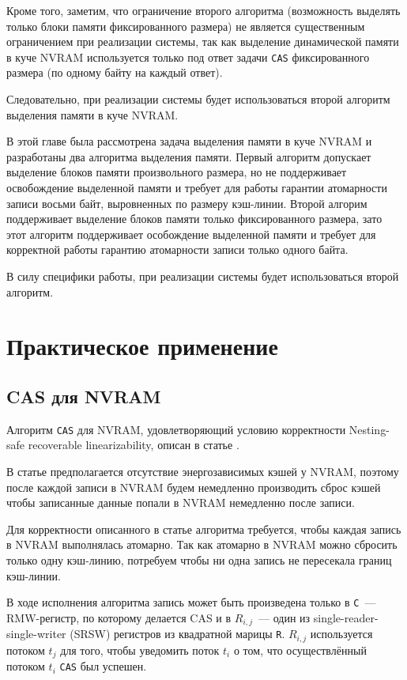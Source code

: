 \documentclass[times,specification,annotation]{itmo-student-thesis}
\begin{document}
Кроме того, заметим, что ограничение второго алгоритма (возможность выделять только блоки памяти фиксированного размера) не является существенным ограничением при реализации системы, так как выделение динамической памяти в куче NVRAM используется только под ответ задачи \texttt{CAS} фиксированного размера (по одному байту на каждый ответ).

Следовательно, при реализации системы будет использоваться второй алгоритм выделения памяти в куче NVRAM.

\chapterconclusion

В этой главе была рассмотрена задача выделения памяти в куче NVRAM и разработаны два алгоритма выделения памяти. Первый алгоритм допускает выделение блоков памяти произвольного размера, но не поддерживает освобождение выделенной памяти и требует для работы гарантии атомарности записи восьми байт, выровненных по размеру кэш-линии. Второй алгорим поддерживает выделение блоков памяти только фиксированного размера, зато этот алгоритм поддерживает особождение выделенной памяти и требует для корректной работы гарантию атомарности записи только одного байта.

В силу специфики работы, при реализации системы будет использоваться второй алгоритм.

\chapter{Практическое применение}

\section{CAS для NVRAM}

Алгоритм \texttt{CAS} для NVRAM, удовлетворяющий условию корректности Nesting-safe recoverable linearizability, описан в статье \cite{attiya2018nesting}.

В статье предполагается отсутствие энергозависимых кэшей у NVRAM, поэтому после каждой записи в NVRAM будем немедленно производить сброс кэшей чтобы записанные данные попали в NVRAM немедленно после записи.

Для корректности описанного в статье алгоритма требуется, чтобы каждая запись в NVRAM выполнялась атомарно. Так как атомарно в NVRAM можно сбросить только одну кэш-линию, потребуем чтобы ни одна запись не пересекала границ кэш-линии.

В ходе исполнения алгоритма запись может быть произведена только в \texttt{C}~--- RMW-регистр, по которому делается CAS и в $R_{i, j}$~--- один из single-reader-single-writer (SRSW) регистров из квадратной марицы \texttt{R}. $R_{i, j}$ используется потоком $t_j$ для того, чтобы уведомить поток $t_i$ о том, что осуществлённый потоком $t_i$ \texttt{CAS} был успешен.
\end{document}
